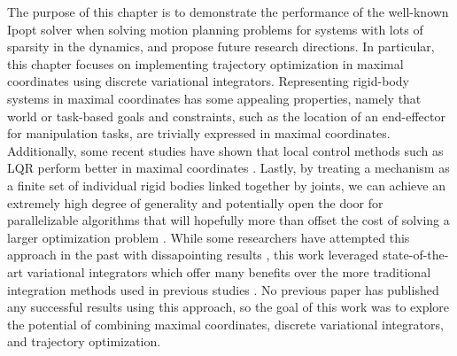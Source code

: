 \documentclass[../root.tex]{subfiles}
\begin{document}

The purpose of this chapter is to demonstrate the performance of the well-known Ipopt solver
when solving motion planning problems for systems with lots of sparsity in the dynamics,
and propose future research directions. 
In particular, this chapter focuses on implementing trajectory optimization in maximal 
coordinates using discrete variational integrators. Representing rigid-body systems in 
maximal coordinates has some appealing properties, namely that world or task-based goals 
and constraints, such as the location of an end-effector for manipulation tasks, are 
trivially expressed in maximal coordinates. Additionally, some recent studies have shown
that local control methods such as LQR perform better in maximal coordinates
\cite{brudigam_LinearTime_2020,brudigam_LinearQuadratic_2021}.  Lastly, by treating a 
mechanism as a finite set of individual rigid bodies linked together by joints, we can 
achieve an extremely high degree of generality and potentially open the door for 
parallelizable algorithms that will hopefully more than offset the cost of solving a larger
optimization problem \cite{baraff_Lineartime_1996}. While some researchers have attempted 
this approach in the past with
dissapointing results \cite{knemeyer_Minor_2020a}, this work leveraged state-of-the-art 
variational integrators 
which offer many benefits over the more traditional integration methods used in previous 
studies
\cite{manchester_Variational_2017,brudigam_LinearTime_2020,marsden_Discrete_2001a}.
No previous paper has published any successful results using this approach, so 
the goal of this work was to explore the potential of combining maximal coordinates, 
discrete variational integrators, and trajectory optimization.
\end{document}
